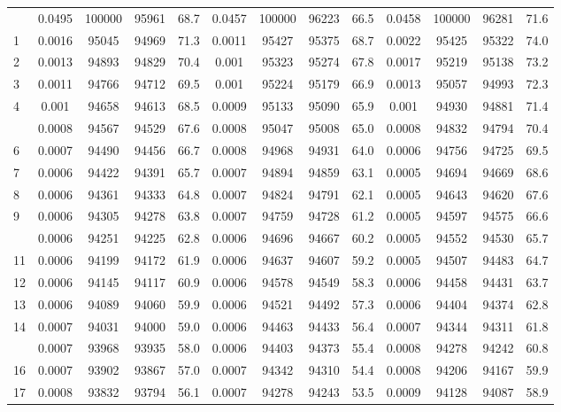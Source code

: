 \documentclass[
  14pt,
]{article}
\begin{document}
\begin{longtable}[t]{lcccccccccccc}
\endfoot
\bottomrule
\endlastfoot
0 & 0.0495 & 100000 & 95961 & 68.7 & 0.0457 & 100000 & 96223 & 66.5 & 0.0458 & 100000 & 96281 & 71.6\\
1 & 0.0016 & 95045 & 94969 & 71.3 & 0.0011 & 95427 & 95375 & 68.7 & 0.0022 & 95425 & 95322 & 74.0\\
2 & 0.0013 & 94893 & 94829 & 70.4 & 0.001 & 95323 & 95274 & 67.8 & 0.0017 & 95219 & 95138 & 73.2\\
3 & 0.0011 & 94766 & 94712 & 69.5 & 0.001 & 95224 & 95179 & 66.9 & 0.0013 & 95057 & 94993 & 72.3\\
4 & 0.001 & 94658 & 94613 & 68.5 & 0.0009 & 95133 & 95090 & 65.9 & 0.001 & 94930 & 94881 & 71.4\\
\addlinespace
5 & 0.0008 & 94567 & 94529 & 67.6 & 0.0008 & 95047 & 95008 & 65.0 & 0.0008 & 94832 & 94794 & 70.4\\
6 & 0.0007 & 94490 & 94456 & 66.7 & 0.0008 & 94968 & 94931 & 64.0 & 0.0006 & 94756 & 94725 & 69.5\\
7 & 0.0006 & 94422 & 94391 & 65.7 & 0.0007 & 94894 & 94859 & 63.1 & 0.0005 & 94694 & 94669 & 68.6\\
8 & 0.0006 & 94361 & 94333 & 64.8 & 0.0007 & 94824 & 94791 & 62.1 & 0.0005 & 94643 & 94620 & 67.6\\
9 & 0.0006 & 94305 & 94278 & 63.8 & 0.0007 & 94759 & 94728 & 61.2 & 0.0005 & 94597 & 94575 & 66.6\\
\addlinespace
10 & 0.0006 & 94251 & 94225 & 62.8 & 0.0006 & 94696 & 94667 & 60.2 & 0.0005 & 94552 & 94530 & 65.7\\
11 & 0.0006 & 94199 & 94172 & 61.9 & 0.0006 & 94637 & 94607 & 59.2 & 0.0005 & 94507 & 94483 & 64.7\\
12 & 0.0006 & 94145 & 94117 & 60.9 & 0.0006 & 94578 & 94549 & 58.3 & 0.0006 & 94458 & 94431 & 63.7\\
13 & 0.0006 & 94089 & 94060 & 59.9 & 0.0006 & 94521 & 94492 & 57.3 & 0.0006 & 94404 & 94374 & 62.8\\
14 & 0.0007 & 94031 & 94000 & 59.0 & 0.0006 & 94463 & 94433 & 56.4 & 0.0007 & 94344 & 94311 & 61.8\\
\addlinespace
15 & 0.0007 & 93968 & 93935 & 58.0 & 0.0006 & 94403 & 94373 & 55.4 & 0.0008 & 94278 & 94242 & 60.8\\
16 & 0.0007 & 93902 & 93867 & 57.0 & 0.0007 & 94342 & 94310 & 54.4 & 0.0008 & 94206 & 94167 & 59.9\\
17 & 0.0008 & 93832 & 93794 & 56.1 & 0.0007 & 94278 & 94243 & 53.5 & 0.0009 & 94128 & 94087 & 58.9\\

\end{longtable}
\end{document}
